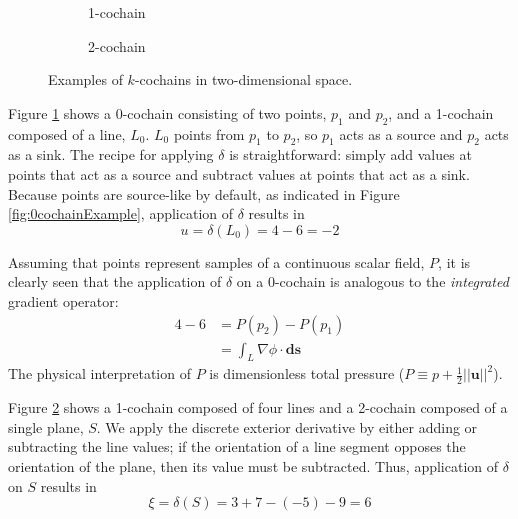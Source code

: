 \begin{figure}[ht]
\begin{subfigure}[c]{0.3\textwidth}
{
            \vfill
        }
        \caption{1-cochain}
        \label{fig:1cochainExample}
    \end{subfigure}
    \begin{subfigure}[c]{0.3\textwidth}
        \centering
        \usebox{\boxExample}
        \caption{2-cochain}
        \label{fig:2cochainExample}
    \end{subfigure}
    \caption{Examples of $k$-cochains in two-dimensional space.}
    \label{fig:cochainExamples}
\end{figure}

Figure \ref{fig:1cochainExample} shows a 0-cochain consisting of two points, $p_1$ and $p_2$, and a 1-cochain composed of a line, $L_0$. $L_0$ points from $p_1$ to $p_2$, so $p_1$ acts as a source and $p_2$ acts as a sink. The recipe for applying $\delta$ is straightforward: simply add values at points that act as a source and subtract values at points that act as a sink. Because points are source-like by default, as indicated in Figure \ref{fig:0cochainExample}, application of $\delta$ results in
\begin{equation}
    u = \delta(L_0) = 4 - 6 = -2
\end{equation}

Assuming that points represent samples of a continuous scalar field, $P$, it is clearly seen that the application of $\delta$ on a 0-cochain is analogous to the \emph{integrated} gradient operator:
\begin{equation}
    \begin{split}
        4 - 6 &= P(p_2) - P(p_1) \\
        &= \int_{L} \nabla \phi \cdot \mathbf{ds}
    \end{split}
\end{equation}
The physical interpretation of $P$ is dimensionless total pressure ($P \equiv p + \frac{1}{2}||\mathbf{u}||^2$).

Figure \ref{fig:2cochainExample} shows a 1-cochain composed of four lines and a 2-cochain composed of a single plane, $S$. We apply the discrete exterior derivative by either adding or subtracting the line values; if the orientation of a line segment opposes the orientation of the plane, then its value must be subtracted. Thus, application of $\delta$ on $S$ results in\begin{equation}
    \xi = \delta(S) = 3 + 7 - (-5) - 9 = 6
\end{equation}


